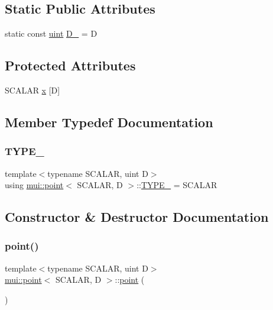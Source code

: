 \subsection*{Static Public Attributes}
\begin{DoxyCompactItemize}
\item 
static const \hyperlink{namespacemui_af15a3e7188a2117fb9965277bb0cacd2}{uint} \hyperlink{structmui_1_1point_a5590d1e5d4ce5ae52b9225d8a1b189cb}{D\+\_\+} = D
\end{DoxyCompactItemize}
\subsection*{Protected Attributes}
\begin{DoxyCompactItemize}
\item 
S\+C\+A\+L\+AR \hyperlink{structmui_1_1point_a839ca7be3c4811a7e325ac02c39d9e18}{x} \mbox{[}D\mbox{]}
\end{DoxyCompactItemize}


\subsection{Member Typedef Documentation}
\mbox{\label{structmui_1_1point_a5d9eeaa8bfdd3be725481b658ef81f58}} 
\subsubsection{\texorpdfstring{T\+Y\+P\+E\+\_\+}{TYPE\_}}
{\footnotesize\ttfamily template$<$typename S\+C\+A\+L\+AR, uint D$>$ \\
using \hyperlink{structmui_1_1point}{mui\+::point}$<$ S\+C\+A\+L\+AR, D $>$\+::\hyperlink{structmui_1_1point_a5d9eeaa8bfdd3be725481b658ef81f58}{T\+Y\+P\+E\+\_\+} =  S\+C\+A\+L\+AR}



\subsection{Constructor \& Destructor Documentation}
\mbox{\label{structmui_1_1point_a94eacbdaa853f730373ad155e13095fc}} 
\subsubsection{\texorpdfstring{point()}{point()}\hspace{0.1cm}{\footnotesize\ttfamily [1/15]}}
{\footnotesize\ttfamily template$<$typename S\+C\+A\+L\+AR, uint D$>$ \\
\hyperlink{structmui_1_1point}{mui\+::point}$<$ S\+C\+A\+L\+AR, D $>$\+::\hyperlink{structmui_1_1point}{point} (\begin{DoxyParamCaption}{ }\end{DoxyParamCaption})\hspace{0.3cm}{\ttfamily [inline]}}

